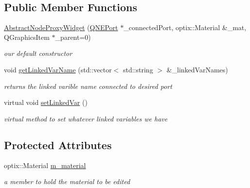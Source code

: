 \subsection*{Public Member Functions}
\begin{DoxyCompactItemize}
\item 
\hypertarget{class_abstract_node_proxy_widget_a7ffe16a97b194e29c4bc15983e85402f}{\hyperlink{class_abstract_node_proxy_widget_a7ffe16a97b194e29c4bc15983e85402f}{Abstract\-Node\-Proxy\-Widget} (\hyperlink{class_q_n_e_port}{Q\-N\-E\-Port} $\ast$\-\_\-connected\-Port, optix\-::\-Material \&\-\_\-mat, Q\-Graphics\-Item $\ast$\-\_\-parent=0)}\label{class_abstract_node_proxy_widget_a7ffe16a97b194e29c4bc15983e85402f}

\begin{DoxyCompactList}\small\item\em our default constructor \end{DoxyCompactList}\item 
void \hyperlink{class_abstract_node_proxy_widget_aeac0d3fa1930be2396e2ab7c5bf04d35}{get\-Linked\-Var\-Name} (std\-::vector$<$ std\-::string $>$ \&\-\_\-linked\-Var\-Names)
\begin{DoxyCompactList}\small\item\em returns the linked varible name connected to desired port \end{DoxyCompactList}\item 
\hypertarget{class_abstract_node_proxy_widget_a0ffa73887a7646a6aaec547c81231617}{virtual void \hyperlink{class_abstract_node_proxy_widget_a0ffa73887a7646a6aaec547c81231617}{set\-Linked\-Var} ()}\label{class_abstract_node_proxy_widget_a0ffa73887a7646a6aaec547c81231617}

\begin{DoxyCompactList}\small\item\em virtual method to set whatever linked variables we have \end{DoxyCompactList}\end{DoxyCompactItemize}
\subsection*{Protected Attributes}
\begin{DoxyCompactItemize}
\item 
\hypertarget{class_abstract_node_proxy_widget_a141801dfcb39ad2b60f61b7a98e95ea5}{optix\-::\-Material \hyperlink{class_abstract_node_proxy_widget_a141801dfcb39ad2b60f61b7a98e95ea5}{m\-\_\-material}}\label{class_abstract_node_proxy_widget_a141801dfcb39ad2b60f61b7a98e95ea5}

\begin{DoxyCompactList}\small\item\em a member to hold the material to be edited \end{DoxyCompactList}\end{DoxyCompactItemize}
